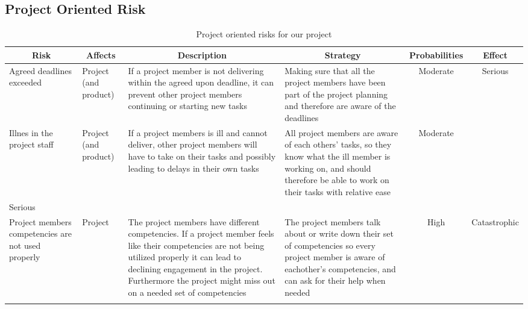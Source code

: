 \subsection{Project Oriented Risk}

\begin{longtable}[c]{@{}p{}p{}p{}p{}cc@{}}\toprule
\multicolumn{1}{c}{\textbf{Risk}}                  & \multicolumn{1}{c}{\textbf{Affects}} & \multicolumn{1}{c}{\textbf{Description}}                                                                                                                                                                                                                      & \multicolumn{1}{c}{\textbf{Strategy}}                                                                                                                                        & \multicolumn{1}{c}{\textbf{Probabilities}} & \multicolumn{1}{c}{\textbf{Effect}}                           \\* \midrule
\endhead
Agreed deadlines exceeded                          & Project (and product)                & If a project member is not delivering within the agreed upon deadline, it can prevent other project members continuing or starting new tasks                                                                                                                  & Making sure that all the project members have been part of the project planning and therefore are aware of the deadlines                                                     & Moderate                                   & Serious                                                       \\* \midrule
Illnes in the project staff                        & Project (and product)                & If a project members is ill and cannot deliver, other project members will have to take on their tasks and possibly leading to delays in their own tasks                                                                                                      & All project members are aware of each others' tasks, so they know what the ill member is working on, and should therefore be able to work on their tasks with relative ease  & Moderate                                   & \begin{tabular}[c]{@{}l@{}}Tolerable--\\ Serious\end{tabular} \\* \midrule
Project members competencies are not used properly & Project                              & The project members have different competencies. If a project member feels like their competencies are not being utilized properly it can lead to declining engagement in the project. Furthermore the project might miss out on a needed set of competencies & The project members talk about or write down their set of  competencies so every project member is aware of eachother's competencies, and can ask for their help when needed & High                                       & Catastrophic                                                  \\* \bottomrule
\caption{Project oriented risks for our project}
\label{table_project_risks}
\end{longtable}
\pagebreak
